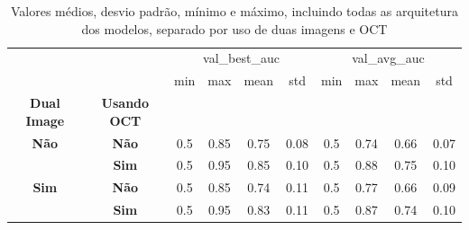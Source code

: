 \begin{table}
\centering
\caption{Valores médios, desvio padrão, mínimo e máximo, incluindo todas as arquitetura dos modelos, separado por uso de duas imagens e OCT}
\label{tab:aucdboct}
\begin{tabular}{c|c|c|c|c|c|c|c|c|c}
\toprule
    &     & \multicolumn{4}{c|}{val\_best\_auc} & \multicolumn{4}{c|}{val\_avg\_auc} \\
    &     &          min &   max &  mean &   std &         min &   max &  mean &   std \\
\textbf{Dual Image} & \textbf{Usando OCT} &              &       &       &       &             &       &       &       \\
\midrule
\textbf{Não} & \textbf{Não} &          0.5 &  0.85 &  0.75 &  0.08 &         0.5 &  0.74 &  0.66 &  0.07 \\
    & \textbf{Sim} &          0.5 &  0.95 &  0.85 &  0.10 &         0.5 &  0.88 &  0.75 &  0.10 \\
\textbf{Sim} & \textbf{Não} &          0.5 &  0.85 &  0.74 &  0.11 &         0.5 &  0.77 &  0.66 &  0.09 \\
    & \textbf{Sim} &          0.5 &  0.95 &  0.83 &  0.11 &         0.5 &  0.87 &  0.74 &  0.10 \\
\bottomrule
\end{tabular}
\end{table}
